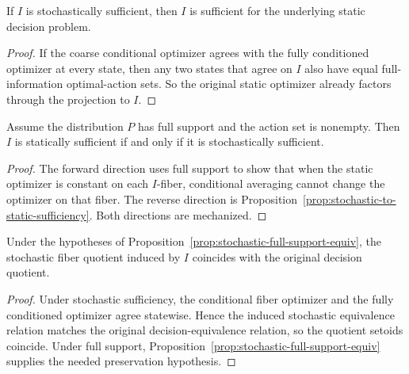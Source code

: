 \begin{proposition}\label{prop:stochastic-to-static-sufficiency}
If $I$ is stochastically sufficient, then $I$ is sufficient for the underlying static decision problem.
\end{proposition}


\begin{proof}
If the coarse conditional optimizer agrees with the fully conditioned optimizer at every state, then any two states that agree on $I$ also have equal full-information optimal-action sets. So the original static optimizer already factors through the projection to $I$.
\end{proof}

\begin{proposition}\label{prop:stochastic-full-support-equiv}
Assume the distribution $P$ has full support and the action set is nonempty. Then $I$ is statically sufficient if and only if it is stochastically sufficient.
\end{proposition}


\begin{proof}
The forward direction uses full support to show that when the static optimizer is constant on each $I$-fiber, conditional averaging cannot change the optimizer on that fiber. The reverse direction is Proposition~\ref{prop:stochastic-to-static-sufficiency}. Both directions are mechanized.
\end{proof}

\begin{proposition}\label{prop:stochastic-quotient-equiv}
Under the hypotheses of Proposition~\ref{prop:stochastic-full-support-equiv}, the stochastic fiber quotient induced by $I$ coincides with the original decision quotient.
\end{proposition}


\begin{proof}
Under stochastic sufficiency, the conditional fiber optimizer and the fully conditioned optimizer agree statewise. Hence the induced stochastic equivalence relation matches the original decision-equivalence relation, so the quotient setoids coincide. Under full support, Proposition~\ref{prop:stochastic-full-support-equiv} supplies the needed preservation hypothesis.
\end{proof}

